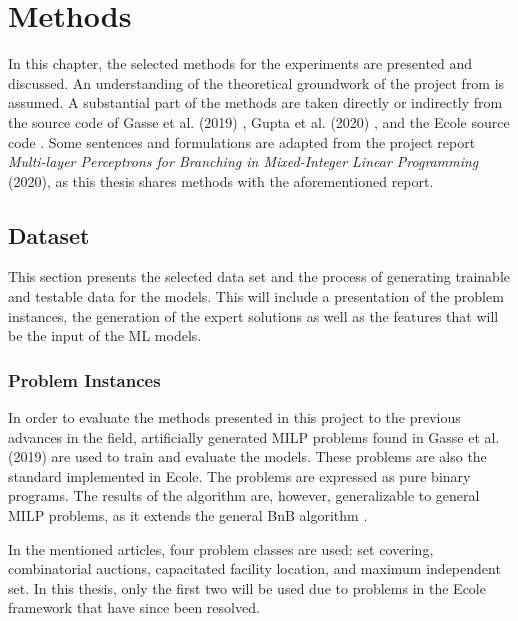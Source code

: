 \chapter{Methods}\label{cha:methods}

In this chapter, the selected methods for the experiments are presented and discussed.  
An understanding of the theoretical groundwork of the project from  is assumed. A substantial part of the methods are taken directly or indirectly from the source code of Gasse et al. (2019) \cite{gasse2019exact}, Gupta et al. (2020) \cite{gupta2020hybrid}, and the \gls{Ecole} source code \cite{prouvost2020ecole}. Some sentences and formulations are adapted from the project report \textit{Multi-layer Perceptrons for Branching in Mixed-Integer Linear Programming} (2020), as this thesis shares methods with the aforementioned report. 


\section{Dataset}\label{sec:dataset}

This section presents the selected data set and the process of generating trainable and testable data for the models. 
This will include a presentation of the problem instances, the generation of the expert solutions as well as the features that will be the input of the \gls{ML} models. 



\subsection{Problem Instances}\label{ssec:probleminstances}

In order to evaluate the methods presented in this project to the previous advances in the field, artificially generated \gls{MILP} problems found in Gasse et al. (2019) \cite{gasse2019exact} are used to train and evaluate the models. These problems are also the standard implemented in \gls{Ecole}.
The problems are expressed as pure binary programs. The results of the algorithm are, however, generalizable to general \gls{MILP} problems, as it extends the general \gls{BnB} algorithm \cite{gasse2019exact}. 

In the mentioned articles, four problem classes are used: set covering, combinatorial auctions, capacitated facility location, and maximum independent set. In this thesis, only the first two will be used due to problems in the \gls{Ecole} framework that have since been resolved. 

